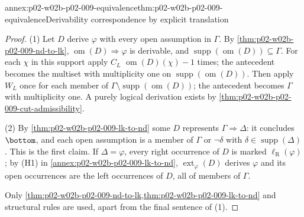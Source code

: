 \begin{annexitem}{annex:p02-w02b-p02-009-equivalence}{thm:p02-w02b-p02-009-equivalence}{Derivability correspondence by explicit translation}
\begin{proof}
(1) Let \(D\) derive \(\varphi\) with every open assumption in \(\Gamma\).  By
\cref{thm:p02-w02b-p02-009-nd-to-lk},
\(\operatorname{om}(D)\Rightarrow\varphi\) is derivable, and
\(\operatorname{supp}(\operatorname{om}(D))\subseteq\Gamma\).  For each
\(\chi\) in this support apply \(C_L\) \(\operatorname{om}(D)(\chi)-1\)
times; the antecedent becomes the multiset with multiplicity one on
\(\operatorname{supp}(\operatorname{om}(D))\).  Then apply \(W_L\) once for
each member of \(\Gamma\setminus\operatorname{supp}(\operatorname{om}(D))\);
the antecedent becomes \(\Gamma\) with multiplicity one.  A purely logical
derivation exists by \cref{thm:p02-w02b-p02-009-cut-admissibility}.

(2) By \cref{thm:p02-w02b-p02-009-lk-to-nd} some \(D\) represents
\(\Gamma\Rightarrow\Delta\): it concludes \(\bottom\), and each open
assumption is a member of \(\Gamma\) or \(\neg\delta\) with
\(\delta\in\operatorname{supp}(\Delta)\).  This is the first claim.  If
\(\Delta=\varphi\), every right occurrence of \(D\) is marked
\(\ell_{\mathrm R}(\varphi)\); by (H1) in
\cref{annex:p02-w02b-p02-009-lk-to-nd}, \(\operatorname{ext}_\varphi(D)\)
derives \(\varphi\) and its open occurrences are the left occurrences of
\(D\), all of members of \(\Gamma\).

Only \cref{thm:p02-w02b-p02-009-nd-to-lk,thm:p02-w02b-p02-009-lk-to-nd} and
structural rules are used, apart from the final sentence of (1).
\end{proof}
\end{annexitem}
